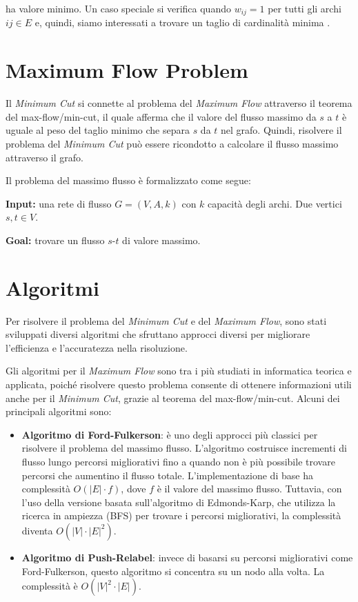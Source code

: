             ha valore minimo. Un caso speciale si verifica quando $w_{ij} = 1$ per tutti gli archi $ij \in E$ e, quindi, siamo interessati a trovare un taglio di cardinalità minima \cite{Lancia2022}.
    
    \section{Maximum Flow Problem}

        Il \textit{Minimum Cut} si connette al problema del \textit{Maximum Flow} attraverso il teorema del max-flow/min-cut, il quale afferma che il valore del flusso massimo da $s$ a $t$ è uguale al peso del taglio minimo che separa $s$ da $t$ nel grafo. Quindi, risolvere il problema del \textit{Minimum Cut} può essere ricondotto a calcolare il flusso massimo attraverso il grafo.

        Il problema del massimo flusso è formalizzato come segue:
        
        \textbf{Input:} una rete di flusso $G = (V, A, k)$ con $k$ capacità degli archi. Due vertici $s,t \in V$.
        
        \textbf{Goal:} trovare un flusso $s$-$t$ di valore massimo.

    \section{Algoritmi}\label{sec:algoritmi}

        Per risolvere il problema del \textit{Minimum Cut} e del \textit{Maximum Flow}, sono stati sviluppati diversi algoritmi che sfruttano approcci diversi per migliorare l'efficienza e l'accuratezza nella risoluzione.
    
        Gli algoritmi per il \textit{Maximum Flow} sono tra i più studiati in informatica teorica e applicata, poiché risolvere questo problema consente di ottenere informazioni utili anche per il \textit{Minimum Cut}, grazie al teorema del max-flow/min-cut. Alcuni dei principali algoritmi sono:

        \begin{itemize}
            \item \textbf{Algoritmo di Ford-Fulkerson}: è uno degli approcci più classici per risolvere il problema del massimo flusso. L'algoritmo costruisce incrementi di flusso lungo percorsi migliorativi fino a quando non è più possibile trovare percorsi che aumentino il flusso totale. L'implementazione di base ha complessità $O(|E| \cdot f)$, dove $f$ è il valore del massimo flusso. Tuttavia, con l'uso della versione basata sull'algoritmo di Edmonds-Karp, che utilizza la ricerca in ampiezza (BFS) per trovare i percorsi migliorativi, la complessità diventa $O(|V| \cdot |E|^2)$.
            
            \item \textbf{Algoritmo di Push-Relabel}: invece di basarsi su percorsi migliorativi come Ford-Fulkerson, questo algoritmo si concentra su un nodo alla volta. La complessità è $O(|V|^2 \cdot |E|)$.
        \end{itemize}

